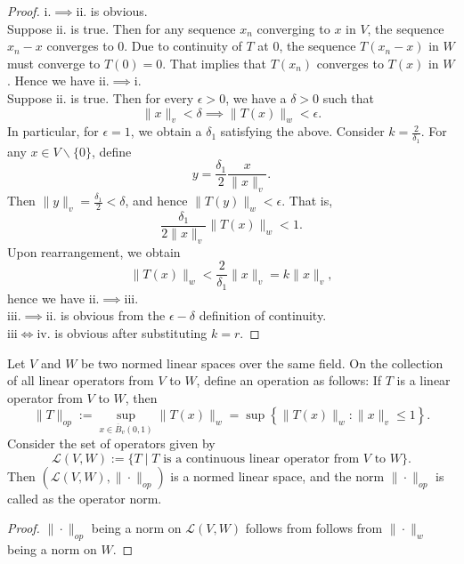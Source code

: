 \begin{proof}
    i.$\implies$ii. is obvious.\\ 
    Suppose ii. is true. Then for any sequence $x_{n}$ converging to $x$ in $V$, the sequence $x_{n}-x$ converges to $0$. Due to continuity of $T$ at $0$, the sequence $T(x_{n}-x)$ in $W$ must converge to $T(0)=0$. That implies that $T(x_{n})$ converges to $T(x)$ in $W$. Hence we have ii.$\implies$i.\\ 
    Suppose ii. is true. Then for every $\epsilon>0$, we have a $\delta>0$ such that $$\|x\|_{v}<\delta\implies\|T(x)\|_{w}<\epsilon.$$
    In particular, for $\epsilon = 1$, we obtain a $\delta_{1}$ satisfying the above. Consider $k=\frac{2}{\delta_{1}}$. For any $x\in V\backslash\{0\}$, define $$y=\frac{\delta_{1}}{2}\frac{x}{\|x\|_{v}}.$$
    Then $\|y\|_{v}=\frac{\delta_{1}}{2}<\delta$, and hence $\|T(y)\|_{w}<\epsilon$. That is, $$\frac{\delta_{1}}{2\|x\|_{v}}\|T(x)\|_{w}<1.$$
    Upon rearrangement, we obtain $$\|T(x)\|_{w}<\frac{2}{\delta_{1}}\|x\|_{v}=k\|x\|_{v},$$
    hence we have ii.$\implies$iii.\\ 
    iii.$\implies$ii. is obvious from the $\epsilon-\delta$ definition of continuity.\\
    iii$\iff$iv. is obvious after substituting $k=r$.
\end{proof}
\vspace{0.4cm}
\begin{eg}
    Let $V$ and $W$ be two normed linear spaces over the same field. On the collection of all linear operators from $V$ to $W$, define an operation as follows:
    If $T$ is a linear operator from $V$ to $W$, then $$\|T\|_{op}:=\sup_{x\in\overline{B}_{v}(0,1)}\|T(x)\|_{w}=\sup\left\{\|T(x)\|_{w} : \|x\|_{v}\leq 1\right\}.$$
    Consider the set of operators given by $$\mathcal{L}(V,W):=\{T\mid T\text{ is a continuous linear operator from }V\text{ to }W\}.$$
    Then $(\mathcal{L}(V,W),\|\cdot\|_{op})$ is a normed linear space, and the norm $\|\cdot\|_{op}$ is called as the operator norm.
\end{eg}
\begin{proof}
    $\|\cdot\|_{op}$ being a norm on $\mathcal{L}(V,W)$ follows from follows from $\|\cdot\|_{w}$ being a norm on $W$.
\end{proof}
\vspace{0.4cm}
